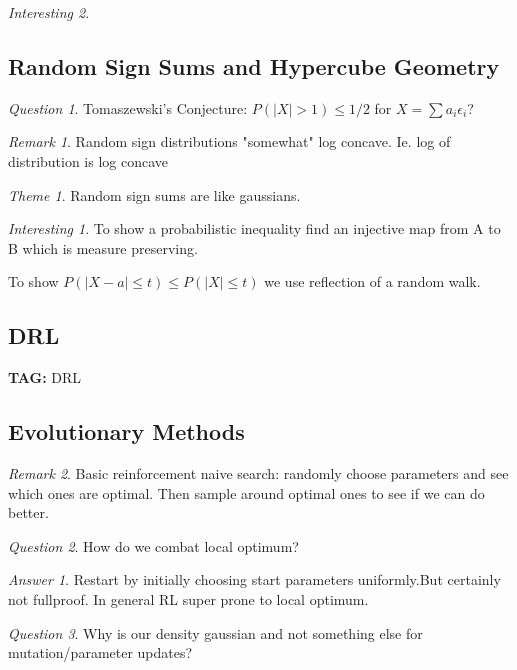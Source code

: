 \documentclass[11pt]{article}
\theoremstyle{remark}
\newtheorem{remark}{Remark}
\newtheorem{quest}{Question}
\newtheorem{ans}{Answer}
\newtheorem{interest}{Interesting}
\newtheorem{theme}{Theme}
\begin{document}
\begin{interest}
\subsection{Random Sign Sums and Hypercube Geometry}

\begin{quest}
Tomaszewski's Conjecture: $P(|X| > 1) \leq 1/2$ for $X = \sum a_i \epsilon_i$?
\end{quest}

\begin{remark}
	Random sign distributions "somewhat" log concave. Ie. log of distribution is log concave
\end{remark}

\begin{theme}
	Random sign sums are like gaussians. 
\end{theme}

\begin{interest}
	To show a probabilistic inequality find an injective map from A to B which is measure preserving. 

	To show $P(|X-a| \leq t) \leq P(|X| \leq t)$ we use reflection of a random walk.
\end{interest}

\subsection{DRL}

\textbf{TAG:} DRL

\subsection{Evolutionary Methods}

\begin{remark}
	Basic reinforcement naive search: randomly choose parameters and see which ones are optimal. Then sample around optimal ones to see if we can do better.
\end{remark}

\begin{quest}
	How do we combat local optimum?
\end{quest}

\begin{ans}
	Restart by initially choosing start parameters uniformly.But certainly not fullproof. In general RL super prone to local optimum.
\end{ans}

\begin{quest}
	Why is our density gaussian and not something else for mutation/parameter updates?
\end{quest}


\end{interest}
\end{document}
